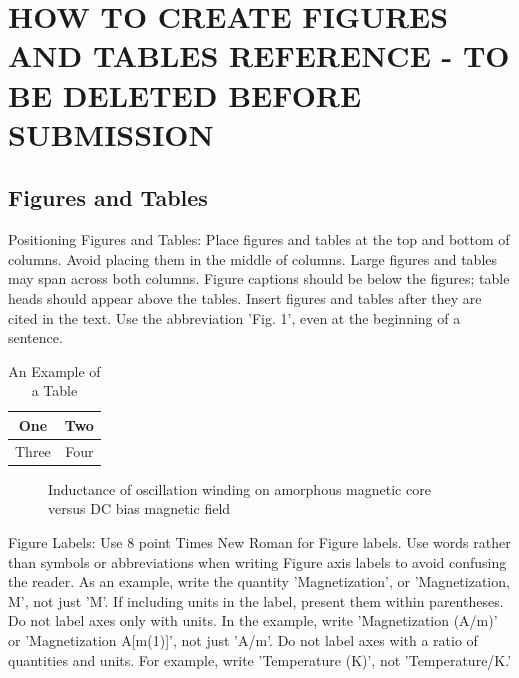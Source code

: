 \documentclass[letterpaper, 10 pt, conference]{ieeeconf}  %
\begin{document}
\section{HOW TO CREATE FIGURES AND TABLES REFERENCE - TO BE DELETED BEFORE SUBMISSION}
\subsection{Figures and Tables}

Positioning Figures and Tables: Place figures and tables at the top and bottom of columns. Avoid placing them in the middle of columns. Large figures and tables may span across both columns. Figure captions should be below the figures; table heads should appear above the tables. Insert figures and tables after they are cited in the text. Use the abbreviation 'Fig. 1', even at the beginning of a sentence.

\begin{table}[h]
\caption{An Example of a Table}
\label{table_example}
\begin{center}
\begin{tabular}{|c||c|}
\hline
One & Two\\
\hline
Three & Four\\
\hline
\end{tabular}
\end{center}
\end{table}


   \begin{figure}[thpb]
      \centering
      \caption{Inductance of oscillation winding on amorphous
       magnetic core versus DC bias magnetic field}
      \label{figurelabel}
   \end{figure}
   

Figure Labels: Use 8 point Times New Roman for Figure labels. Use words rather than symbols or abbreviations when writing Figure axis labels to avoid confusing the reader. As an example, write the quantity 'Magnetization', or 'Magnetization, M', not just 'M'. If including units in the label, present them within parentheses. Do not label axes only with units. In the example, write 'Magnetization (A/m)' or 'Magnetization {A[m(1)]}', not just 'A/m'. Do not label axes with a ratio of quantities and units. For example, write 'Temperature (K)', not 'Temperature/K.'
\end{document}
